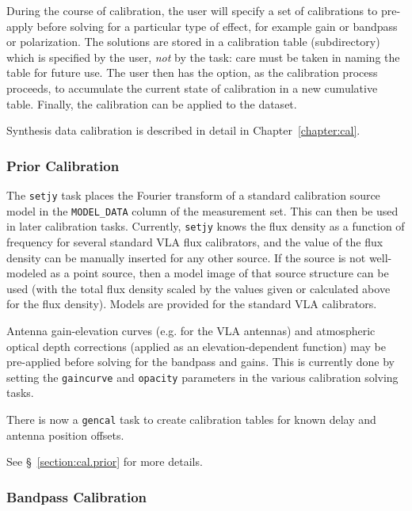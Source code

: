 During the course of calibration, the user will specify a set of
calibrations to pre-apply before solving for a particular type of
effect, for example gain or bandpass or polarization.  The solutions
are stored in a calibration table (subdirectory) which is specified by
the user, {\it not} by the task: care must be taken in naming the
table for future use.  The user then has the option, as the
calibration process proceeds, to accumulate the current state of 
calibration in a new cumulative table.  Finally, the calibration can
be applied to the dataset.

Synthesis data calibration is described in detail in
Chapter~\ref{chapter:cal}. 

\subsubsection{Prior Calibration}
\label{section:intro.walkthru.calib.prior}

The {\tt setjy} task places the Fourier transform of a standard
calibration source model in the {\tt MODEL\_DATA} column of the
measurement set.  This can then be used in later calibration tasks.
Currently, {\tt setjy} knows the flux density as a function of
frequency for several standard VLA flux calibrators, and the value of
the flux density can be manually inserted for any other source.  If
the source is not well-modeled as a point source, then a model image
of that source structure can be used (with the total flux density
scaled by the values given or calculated above for the flux density).
Models are provided for the standard VLA calibrators.

Antenna gain-elevation curves (e.g. for the VLA antennas) and
atmospheric optical depth corrections (applied as an
elevation-dependent function) may
be pre-applied before solving for the bandpass and gains.  This
is currently done by setting the {\tt gaincurve} and {\tt opacity}
parameters in the various calibration solving tasks.

There is now a {\tt gencal} task to create calibration tables for
known delay and antenna position offsets.

See \S~\ref{section:cal.prior} for more details.

\subsubsection{Bandpass Calibration}
\label{section:intro.walkthru.calib.bpass}

